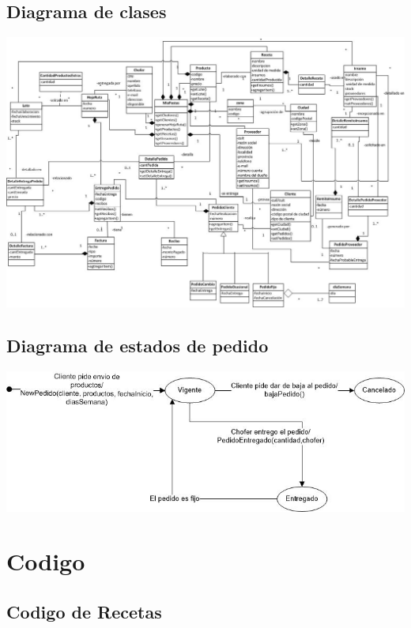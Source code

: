 \documentclass[letterpaper,10pt,english]{sphinxmanual}
\begin{document}
\section{Diagrama de clases}
\label{proyecto:diagrama-de-clases}
\includegraphics{DIAGRAMAClases.jpg}


\section{Diagrama de estados de pedido}
\label{proyecto:diagrama-de-estados-de-pedido}
\includegraphics{diagramaEstadospedido.jpg}


\chapter{Codigo}
\label{codigo:codigo}\label{codigo::doc}

\section{Codigo de Recetas}
\label{codigo recetas:codigo-de-recetas}\label{codigo recetas::doc}\label{codigo recetas:module-recetas.models}
\end{document}
